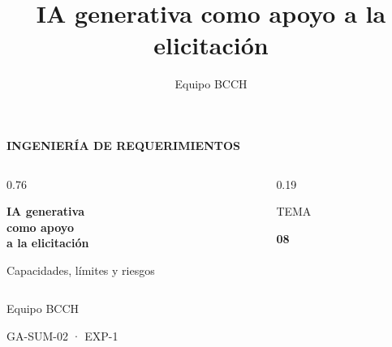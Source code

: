 \documentclass[aspectratio=169,12pt]{beamer}
\title{IA generativa como apoyo a la elicitación}
\author{Equipo BCCH}
\date{}
\begin{document}
{
\begin{frame}[plain,t]
\vspace*{8mm}
{\fontsize{7.5}{9}\selectfont\bfseries\color{Pale}INGENIERÍA DE REQUERIMIENTOS\par}
\vspace{7mm}
\begin{columns}[T,onlytextwidth]
\begin{column}{0.76\textwidth}
{\fontsize{27}{30}\selectfont\bfseries\color{white}IA generativa\\como apoyo\\a la elicitación\par}
\vspace{4mm}
{\fontsize{12}{15}\selectfont\color{Pale}Capacidades, límites y riesgos\par}
\end{column}
\begin{column}{0.19\textwidth}
\vspace{2mm}
{\fontsize{7.5}{9}\selectfont\color{Pale}TEMA\par}
\vspace{1mm}
{\fontsize{48}{50}\selectfont\bfseries\color{Amber}08\par}
\end{column}
\end{columns}
\vfill
{\fontsize{9}{11}\selectfont\color{white}Equipo BCCH\par}
\vspace{1.5mm}
{\fontsize{7.5}{9}\selectfont\color{Pale}GA-SUM-02 · EXP-1\par}
\vspace{7mm}
\end{frame}
}
\end{document}
